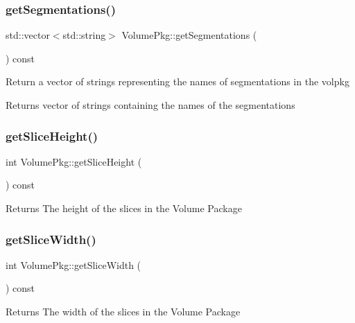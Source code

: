 \subsubsection{\texorpdfstring{get\+Segmentations()}{getSegmentations()}}
{\footnotesize\ttfamily std\+::vector$<$std\+::string$>$ Volume\+Pkg\+::get\+Segmentations (\begin{DoxyParamCaption}{ }\end{DoxyParamCaption}) const}

Return a vector of strings representing the names of segmentations in the volpkg \begin{DoxyReturn}{Returns}
vector of strings containing the names of the segmentations 
\end{DoxyReturn}
\hypertarget{classVolumePkg_a28bc3bf24aa05a6c802888a3fb862aec}{}\label{classVolumePkg_a28bc3bf24aa05a6c802888a3fb862aec} 
\subsubsection{\texorpdfstring{get\+Slice\+Height()}{getSliceHeight()}}
{\footnotesize\ttfamily int Volume\+Pkg\+::get\+Slice\+Height (\begin{DoxyParamCaption}{ }\end{DoxyParamCaption}) const}

\begin{DoxyReturn}{Returns}
The height of the slices in the Volume Package 
\end{DoxyReturn}
\hypertarget{classVolumePkg_a428f50ef3408fbc8826597d1dcb35ed5}{}\label{classVolumePkg_a428f50ef3408fbc8826597d1dcb35ed5} 
\subsubsection{\texorpdfstring{get\+Slice\+Width()}{getSliceWidth()}}
{\footnotesize\ttfamily int Volume\+Pkg\+::get\+Slice\+Width (\begin{DoxyParamCaption}{ }\end{DoxyParamCaption}) const}

\begin{DoxyReturn}{Returns}
The width of the slices in the Volume Package 
\end{DoxyReturn}
\hypertarget{classVolumePkg_abb42726353738af10e922d0ef41406d6}{}\label{classVolumePkg_abb42726353738af10e922d0ef41406d6} 
